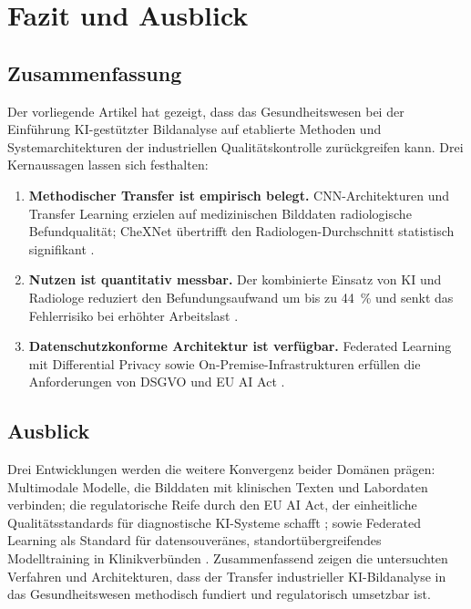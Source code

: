 \section{Fazit und Ausblick} \label{sec:fazit}

\subsection{Zusammenfassung} \label{sec:zusammenfassung}

Der vorliegende Artikel hat gezeigt, dass das Gesundheitswesen bei der Einführung
KI-gestützter Bildanalyse auf etablierte Methoden und Systemarchitekturen der
industriellen Qualitätskontrolle zurückgreifen kann. Drei Kernaussagen lassen sich
festhalten:

\begin{enumerate}
    \item \textbf{Methodischer Transfer ist empirisch belegt.} CNN-Architekturen und
    Transfer Learning erzielen auf medizinischen Bilddaten radiologische Befundqualität;
    CheXNet übertrifft den Radiologen-Durchschnitt statistisch signifikant
    \cite{chexnet2017}.

    \item \textbf{Nutzen ist quantitativ messbar.} Der kombinierte Einsatz von KI und
    Radiologe reduziert den Befundungsaufwand um bis zu 44~\% \cite{breastScreening2025}
    und senkt das Fehlerrisiko bei erhöhter Arbeitslast \cite{workloadErrors2023}.

    \item \textbf{Datenschutzkonforme Architektur ist verfügbar.} Federated Learning mit
    Differential Privacy sowie On-Premise-Infrastrukturen erfüllen die Anforderungen von
    DSGVO und EU AI Act \cite{euAiAct2024, federatedLearning2022}.
\end{enumerate}

\subsection{Ausblick} \label{sec:ausblick}

Drei Entwicklungen werden die weitere Konvergenz beider Domänen prägen: Multimodale
Modelle, die Bilddaten mit klinischen Texten und Labordaten verbinden; die regulatorische
Reife durch den EU AI Act, der einheitliche Qualitätsstandards für diagnostische
KI-Systeme schafft \cite{euAiAct2024}; sowie Federated Learning als Standard für
datensouveränes, standortübergreifendes Modelltraining in Klinikverbünden
\cite{federatedAdvances2025}. Zusammenfassend zeigen die untersuchten Verfahren und
Architekturen, dass der Transfer industrieller KI-Bildanalyse in das Gesundheitswesen
methodisch fundiert und regulatorisch umsetzbar ist.
